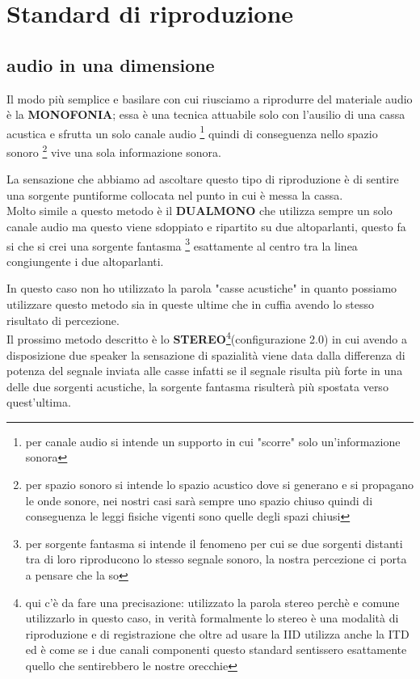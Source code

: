 \documentclass[12pt,a4paper]{report}
\begin{document}


\section{Standard di riproduzione}\label{metodi}

\subsection{audio in una dimensione}
Il modo più semplice e basilare con cui riusciamo a riprodurre del materiale audio è la \textbf{MONOFONIA}; essa è una tecnica attuabile solo con l'ausilio di una cassa acustica e sfrutta un solo canale audio \footnote{per canale audio si intende un supporto in cui "scorre" solo un'informazione sonora}
quindi di conseguenza nello spazio sonoro \footnote{per spazio sonoro si intende lo spazio acustico dove si generano e si propagano le onde sonore, nei nostri casi sarà sempre uno spazio chiuso quindi di conseguenza le leggi fisiche vigenti sono quelle degli spazi chiusi} vive una sola informazione sonora.

La sensazione che abbiamo ad ascoltare questo tipo di riproduzione è di sentire una sorgente puntiforme collocata nel punto in cui è messa la cassa.\\

Molto simile a questo metodo è il \textbf{DUALMONO} che utilizza sempre un solo canale audio ma questo viene sdoppiato e ripartito su due altoparlanti, questo fa si che si crei una sorgente fantasma \footnote{per sorgente fantasma si intende il fenomeno per cui se due sorgenti distanti tra di loro riproducono lo stesso segnale sonoro, la nostra percezione ci porta a pensare che la so} esattamente al centro tra la linea congiungente i due altoparlanti. 

In questo caso non ho utilizzato la parola "casse acustiche" in quanto possiamo utilizzare questo metodo sia in queste ultime che in cuffia avendo lo stesso risultato di percezione.\\

Il prossimo metodo descritto è lo \textbf{STEREO}\footnote{qui c'è da fare una precisazione: utilizzato la parola stereo perchè e comune utilizzarlo in questo caso, in verità formalmente lo stereo è una modalità di riproduzione e di registrazione che oltre ad usare la IID utilizza anche la ITD ed è come se i due canali componenti questo standard sentissero esattamente quello che sentirebbero le nostre orecchie}(configurazione 2.0) in cui avendo a disposizione due speaker la sensazione di spazialità viene data dalla differenza di potenza del segnale inviata alle casse infatti se il segnale risulta più forte in una delle due sorgenti acustiche, la sorgente fantasma risulterà più spostata verso quest'ultima.
\end{document}
